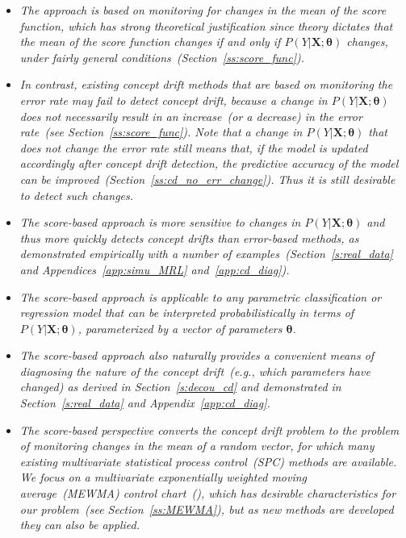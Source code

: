 \documentclass[twoside,11pt]{article}
\begin{document}
\begin{itemize}
\item
\textit{The approach is based on monitoring for changes in the mean of the score function, which has strong theoretical justification since theory dictates that the mean of the score function changes if and only if $P(Y|\bm{X};\bm{\theta})$ changes, under fairly general conditions~(Section~\ref{ss:score_func}).}
\item
\textit{In contrast, existing concept drift methods that are based on monitoring the error rate may fail to detect concept drift, because a change in $P(Y|\bm{X};\bm{\theta})$ does not necessarily result in an increase~(or a decrease) in the error rate~(see Section~\ref{ss:score_func}). Note that a change in $P(Y|\bm{X};\bm{\theta})$ that does not change the error rate still means that, if the model is updated accordingly after concept drift detection, the predictive accuracy of the model can be improved~(Section~\ref{ss:cd_no_err_change}). Thus it is still desirable to detect such changes.}
\item
\textit{The score-based approach is more sensitive to changes in $P(Y|\bm{X}; \bm{\theta})$ and thus more quickly detects concept drifts than error-based methods, as demonstrated empirically with a number of examples~(Section~\ref{s:real_data} and Appendices~\ref{app:simu_MRL} and~\ref{app:cd_diag}).}
\item
\textit{The score-based approach is applicable to any parametric classification or regression model that can be interpreted probabilistically in terms of $P(Y|\bm{X};\bm{\theta})$, parameterized by a vector of parameters $\bm{\theta}$.}
\item
\textit{The score-based approach also naturally provides a convenient means of diagnosing the nature of the concept drift~(e.g., which parameters have changed) as derived in Section~\ref{s:decou_cd} and demonstrated in Section~\ref{s:real_data} and Appendix~\ref{app:cd_diag}.}
\item
\textit{The score-based perspective converts the concept drift problem to the problem of monitoring changes in the mean of a random vector, for which many existing multivariate statistical process control~(SPC) methods are available. We focus on a multivariate exponentially weighted moving average~(MEWMA) control chart~(\cite{lowry1992multivariate,hotelling1947multivariate,montgomery2007introduction}), which has desirable characteristics for our problem~(see Section~\ref{ss:MEWMA}), but as new methods are developed they can also be applied.}

\end{itemize}
\end{document}
